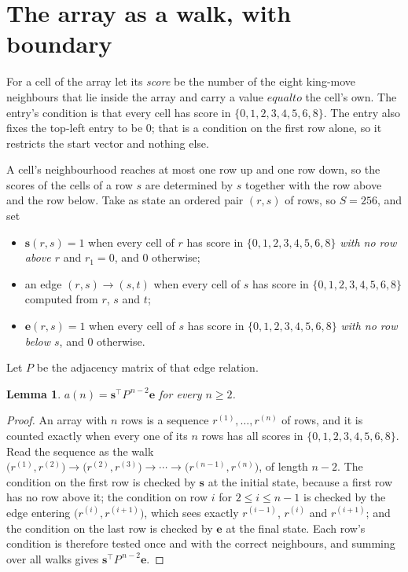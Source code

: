 \documentclass[11pt,a4paper]{article}
\theoremstyle{plain}
\newtheorem{lemma}[theorem]{Lemma}
\theoremstyle{definition}
\begin{document}
\section{The array as a walk, with boundary}

For a cell of the array let its \emph{score} be the number of the eight king-move neighbours that lie inside
the array and carry a value $equal to$ the cell's own. The entry's condition is that every cell
has score in $\{0,1,2,3,4,5,6,8\}$. The entry also fixes the top-left entry to be $0$; that is a condition on the first row alone, so it restricts the start vector and nothing else.

A cell's neighbourhood reaches at most one row up and one row down, so the scores of the
cells of a row $s$ are determined by $s$ together with the row above and the row below.
Take as state an ordered pair $(r,s)$ of rows, so $S=256$, and set
\begin{itemize}
\item $\mathbf{s}(r,s)=1$ when every cell of $r$ has score in $\{0,1,2,3,4,5,6,8\}$ \emph{with no row
above $r$} and $r_1=0$, and $0$ otherwise;
\item an edge $(r,s)\to(s,t)$ when every cell of $s$ has score in $\{0,1,2,3,4,5,6,8\}$ computed from
$r$, $s$ and $t$;
\item $\mathbf{e}(r,s)=1$ when every cell of $s$ has score in $\{0,1,2,3,4,5,6,8\}$ \emph{with no row
below $s$}, and $0$ otherwise.
\end{itemize}
Let $P$ be the adjacency matrix of that edge relation.

\begin{lemma}\label{lem:walk}
$a(n)=\mathbf{s}^{\!\top}P^{\,n-2}\mathbf{e}$ for every $n\ge2$.
\end{lemma}

\begin{proof}
An array with $n$ rows is a sequence $r^{(1)},\dots,r^{(n)}$ of rows, and it is counted
exactly when every one of its $n$ rows has all scores in $\{0,1,2,3,4,5,6,8\}$. Read the sequence as the
walk $\bigl(r^{(1)},r^{(2)}\bigr)\to\bigl(r^{(2)},r^{(3)}\bigr)\to\cdots\to
\bigl(r^{(n-1)},r^{(n)}\bigr)$, of length $n-2$. The condition on the first row is
checked by $\mathbf{s}$ at the initial state, because a first row has no row above it; the
condition on row $i$ for $2\le i\le n-1$ is checked by the edge entering
$\bigl(r^{(i)},r^{(i+1)}\bigr)$, which sees exactly $r^{(i-1)}$, $r^{(i)}$ and
$r^{(i+1)}$; and the condition on the last row is checked by $\mathbf{e}$ at the final
state. Each row's condition is therefore tested once and with the correct neighbours, and
summing over all walks gives $\mathbf{s}^{\!\top}P^{\,n-2}\mathbf{e}$.
\end{proof}
\end{document}
